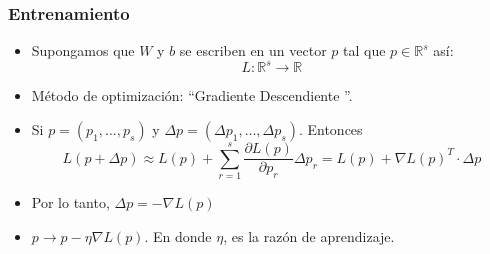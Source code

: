 \documentclass[aspectratio=1610]{beamer}
\begin{document}
  \begin{frame}
    \frametitle{Entrenamiento}

    \begin{itemize}
    \item   Supongamos que $W$ y $b$ se escriben en un vector $p$ tal que $p\in \mathbb{R}^s$ as\'i:
      \begin{displaymath}
        L: \mathbb{R}^s\to \mathbb{R}
      \end{displaymath}
    \item Método de optimizaci\'on:  \textquotedblleft Gradiente Descendiente \textquotedblright.
    \item Si $p=(p_1,\ldots,p_s)$ y $\Delta p = (\Delta p_1, \ldots, \Delta p_s)$. Entonces
      \begin{displaymath}
        L(p+\Delta p) \approx L(p) + \sum_{r=1}^{s} \frac{\partial L(p)}{\partial p_r} \Delta p_r = L(p) + \nabla L(p)^T \cdot \Delta p
      \end{displaymath}
    \item Por lo tanto,  $\Delta p = - \nabla L(p)$ \\
    \item $p \to p - \eta \nabla L(p)$. En donde  $\eta$, es la raz\'on de aprendizaje.
   
    \end{itemize}
  \end{frame}
\end{document}
